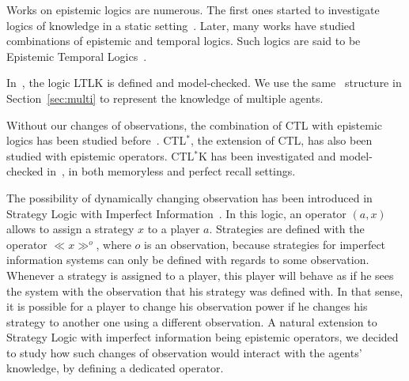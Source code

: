 Works on epistemic logics are numerous. The first ones started to investigate logics of knowledge in a static setting~\cite{sato77}. Later, many works have studied combinations of epistemic and temporal logics. Such logics are said to be Epistemic Temporal Logics~\cite{Dima2009}.

In~\cite{DBLP:conf/fsttcs/MeydenS99}, the logic LTLK is defined and model-checked. We use the same \ktree\ structure in Section~\ref{sec:multi} to represent the knowledge of multiple agents.

Without our changes of observations, the combination of CTL with epistemic logics has been studied before~\cite{DBLP:conf/birthday/LomuscioP12}\cite{DBLP:conf/faabs/LomuscioLP02}.
CTL$^*$, the extension of CTL, has also been studied with epistemic operators. CTL$^*$K has been investigated and model-checked in~\cite{DBLP:conf/atal/KongL17}\cite{DBLP:phd/hal/Maubert14}\cite{BOZZELLI201580}, in both memoryless and perfect recall settings.


The possibility of dynamically changing observation has been introduced in Strategy Logic with Imperfect Information~\cite{DBLP:conf/lics/BerthonMMRV17}. In this logic, an operator $(a,x)$ allows to assign a strategy $x$ to a player $a$. Strategies are defined with the operator $\ll x\gg^o$, where $o$ is an observation, because strategies for imperfect information systems can only be defined with regards to some observation. Whenever a strategy is assigned to a player, this player will behave as if he sees the system with the observation that his strategy was defined with. In that sense, it is possible for a player to change his observation power if he changes his strategy to another one using a different observation. A natural extension to Strategy Logic with imperfect information being epistemic operators, we decided to study how such changes of observation would interact with the agents' knowledge, by defining a dedicated operator.


